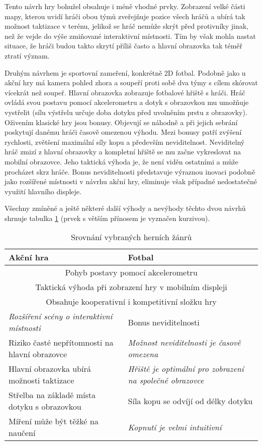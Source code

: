 \documentclass[thesis=B,czech,hidelinks]{FITthesis}[2012/06/26] %
\begin{document}
Tento návrh hry bohužel obsahuje i méně vhodné prvky. Zobrazení velké části mapy, kterou uvidí hráči obou týmů zveřejňuje pozice všech hráčů a ubírá tak možnost taktizace v terénu, jelikož se hráč nemůže skrýt před protivníky jinak, než že vejde do výše zmiňované interaktivní místnosti. Tím by však mohla nastat situace, že hráči budou takto skrytí příliš často a hlavní obrazovka tak téměř ztratí význam.

Druhým návrhem je sportovní zameření, konkrétně 2D fotbal. Podobně jako u akční hry má kamera pohled zhora a soupeří proti sobě dva týmy s cílem skórovat vícekrát než soupeř. Hlavní obrazovka zobrazuje fotbalové hřiště s hráči. Hráč ovládá svou postavu pomocí akcelerometru a dotyk s obrazovkou mu umožňuje vystřelit (sílu výstřelu určuje doba dotyku před uvolněním prstu z obrazovky). Oživením klasické hry jsou bonusy. Objevují se náhodně a při jejich sebrání poskytují danému hráči časově omezenou výhodu. Mezi bonusy patří zvýšení rychlosti, zvětšení maximální síly kopu a především neviditelnost. Neviditelný hráč zmizí z hlavní obrazovky a kompletní hřiště se mu začne vykreslovat na mobilní obrazovce. Jeho taktická výhoda je, že není viděn ostatními a může procházet skrz hráče. Bonus neviditelnosti představuje výraznou inovaci podobně jako rozšířené místnosti v návrhu akční hry, eliminuje však případné nedostatečné využití hlavního displeje.

Všechny zmíněné a ještě některé další výhody a nevýhody těchto dvou návrhů shrnuje tabulka \ref{table:game_comparison} (prvek s větším přínosem je vyznačen kurzivou).

\begin{table}[h]
\caption{Srovnání vybraných herních žánrů}
\label{table:game_comparison}
\begin{tabularx}{\textwidth}{|X|X|}
\hline
\textbf{Akční hra} & \textbf{Fotbal} \\ \hline
\multicolumn{2}{|c|}{Pohyb postavy pomocí akcelerometru}\\ \hline
\multicolumn{2}{|c|}{Taktická výhoda při zobrazení hry v mobilním displeji}\\ \hline
\multicolumn{2}{|c|}{Obsahuje kooperativní i kompetitivní složku hry}\\ \hline
\emph{Rozšíření scény o interaktivní místnosti} & Bonus neviditelnosti \\ \hline
Riziko časté nepřítomnosti na hlavní obrazovce & \emph{Možnost neviditelnosti je časově omezena} \\ \hline
Hlavní obrazovka ubírá možnosti taktizace & \emph{Hřiště je optimální pro zobrazení na společné obrazovce} \\ \hline

Střelba na základě místa dotyku s obrazovkou & Síla kopu se odvíjí od délky dotyku \\ \hline
Míření může být těžké na naučení & \emph{Kopnutí je velmi intuitivní} \\ \hline
\end{tabularx}
\end{table}
\end{document}
